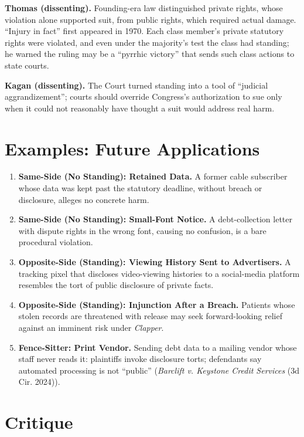 \documentclass[12pt]{article}
\begin{document}
\textbf{Thomas (dissenting).} Founding-era law distinguished private rights, whose violation alone supported suit, from public rights, which required actual damage. ``Injury in fact'' first appeared in 1970. Each class member's private statutory rights were violated, and even under the majority's test the class had standing; he warned the ruling may be a ``pyrrhic victory'' that sends such class actions to state courts.

\textbf{Kagan (dissenting).} The Court turned standing into a tool of ``judicial aggrandizement''; courts should override Congress's authorization to sue only when it could not reasonably have thought a suit would address real harm.

\section{Examples: Future Applications}

\begin{enumerate}
\item \textbf{Same-Side (No Standing): Retained Data.} A former cable subscriber whose data was kept past the statutory deadline, without breach or disclosure, alleges no concrete harm.
\item \textbf{Same-Side (No Standing): Small-Font Notice.} A debt-collection letter with dispute rights in the wrong font, causing no confusion, is a bare procedural violation.
\item \textbf{Opposite-Side (Standing): Viewing History Sent to Advertisers.} A tracking pixel that discloses video-viewing histories to a social-media platform resembles the tort of public disclosure of private facts.
\item \textbf{Opposite-Side (Standing): Injunction After a Breach.} Patients whose stolen records are threatened with release may seek forward-looking relief against an imminent risk under \textit{Clapper}.
\item \textbf{Fence-Sitter: Print Vendor.} Sending debt data to a mailing vendor whose staff never reads it: plaintiffs invoke disclosure torts; defendants say automated processing is not ``public'' (\textit{Barclift v. Keystone Credit Services} (3d Cir. 2024)).
\end{enumerate}

\section{Critique}
\end{document}
